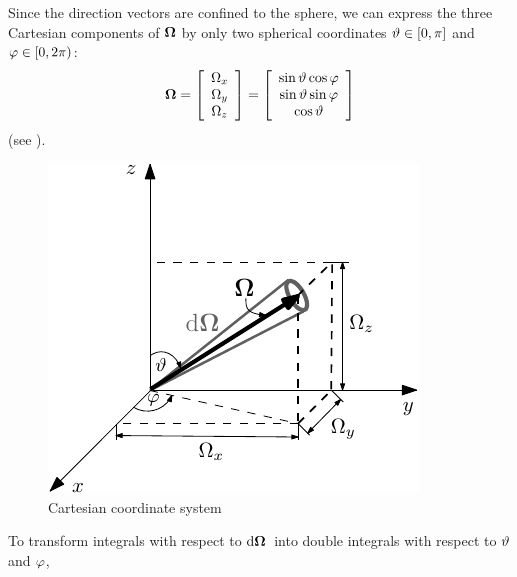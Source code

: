 
Since the direction vectors are confined to the sphere, we can express the three
Cartesian components of $\mathbf{\Omega}$ by only two spherical coordinates $\vartheta\in[0,\pi]$ and
$\varphi\in[0,2\pi)$:
\begin{equation*}
	\mathbf{\Omega} = \left[\begin{array}{c}
		\Omega_x \\
		\Omega_y \\
		\Omega_z
	\end{array}\right] = \left[\begin{array}{c}
		\sin \vartheta\cos \varphi \\
		\sin \vartheta\sin \varphi \\
		\cos \vartheta
	\end{array}\right]
\end{equation*}
(see ).\index{$\vartheta$}
\begin{figure}[!hbt]
    \centering
    \includegraphics[scale=1.275]{cartesian_streaming}
    \caption[Cartesian coordinate system]{Cartesian coordinate system}
    \label{fig:streaming}
\end{figure}
To transform integrals with respect to $\text{d}\mathbf{\Omega}\,$ into double integrals with respect to $\vartheta$ and $\varphi$,

